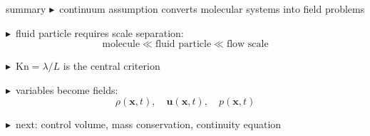 \documentclass[UTF8,9pt]{ctexbeamer}
\newcommand{\uvec}{\bm{u}}
\newcommand{\xvec}{\bm{x}}
\newcommand{\Kn}{\mathrm{Kn}}
\newcommand{\btri}{\textcolor{blue!75!black}{$\blacktriangleright$}}
\begin{document}
\begin{frame}{summary}
\small
\btri\ continuum assumption converts molecular systems into field problems

\vspace{.16cm}
\btri\ fluid particle requires scale separation:
\[
\text{molecule} \ll \text{fluid particle} \ll \text{flow scale}
\]

\vspace{.16cm}
\btri\ $\Kn=\lambda/L$ is the central criterion

\vspace{.16cm}
\btri\ variables become fields:
\[
\rho(\xvec,t),\quad \uvec(\xvec,t),\quad p(\xvec,t)
\]

\vspace{.16cm}
\btri\ next: control volume, mass conservation, continuity equation
\end{frame}
\end{document}
